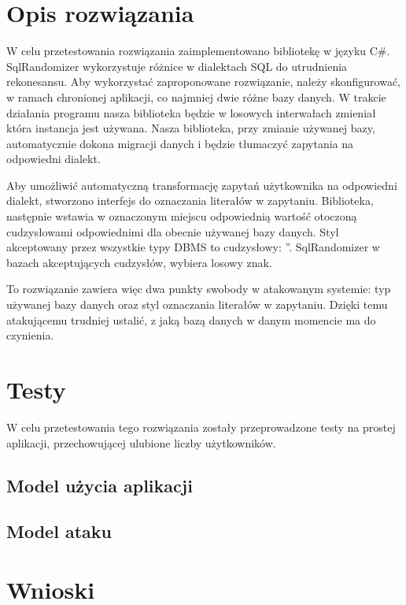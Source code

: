 \documentclass[conference]{IEEEtran}
\begin{document}
\section{Opis rozwiązania}

W celu przetestowania rozwiązania zaimplementowano bibliotekę w języku C\#.
SqlRandomizer wykorzystuje różnice w dialektach SQL do utrudnienia rekonesansu.
Aby wykorzystać zaproponowane rozwiązanie, należy skonfigurować, w ramach chronionej aplikacji, co najmniej dwie różne bazy danych.
W trakcie działania programu nasza biblioteka będzie w losowych interwałach zmieniał która instancja jest używana.
Nasza biblioteka, przy zmianie używanej bazy, automatycznie dokona migracji danych i będzie tłumaczyć zapytania na odpowiedni dialekt.

Aby umożliwić automatyczną transformację zapytań użytkownika na odpowiedni dialekt, stworzono interfejs do oznaczania literałów w zapytaniu.
Biblioteka, następnie wstawia w oznaczonym miejscu odpowiednią wartość otoczoną cudzysłowami odpowiednimi dla obecnie używanej bazy danych.
Styl akceptowany przez wszystkie typy DBMS to cudzysłowy: ''.
SqlRandomizer w bazach akceptujących cudzysłów, wybiera losowy znak.

To rozwiązanie zawiera więc dwa punkty swobody w atakowanym systemie: typ używanej bazy danych oraz styl oznaczania literałów w zapytaniu.
Dzięki temu atakującemu trudniej ustalić, z jaką bazą danych w danym momencie ma do czynienia.

\section{Testy}
W celu przetestowania tego rozwiązania zostały przeprowadzone testy na prostej aplikacji, przechowującej ulubione liczby użytkowników.
\subsection{Model użycia aplikacji}
\subsection{Model ataku}
\section{Wnioski}
\end{document}
